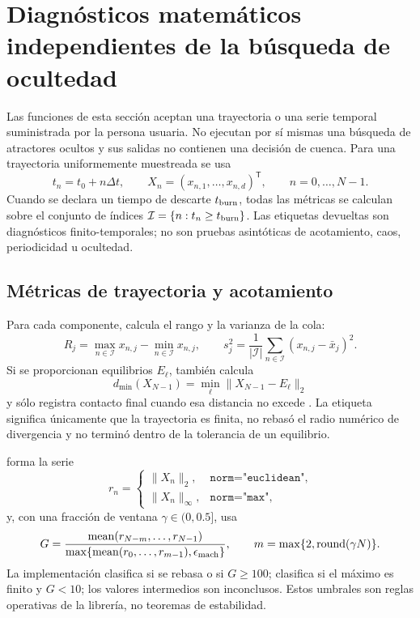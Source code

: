 \section{Diagnósticos matemáticos independientes de la búsqueda de ocultedad}
\label{sec:diagnosticos-independientes}

Las funciones de esta sección aceptan una trayectoria o una serie temporal
suministrada por la persona usuaria. No ejecutan por sí mismas una búsqueda de
atractores ocultos y sus salidas no contienen una decisión de cuenca. Para una
trayectoria uniformemente muestreada se usa
\[
 t_n=t_0+n\Delta t,\qquad
 X_n=(x_{n,1},\ldots,x_{n,d})^\mathsf{T},\qquad n=0,\ldots,N-1.
\]
Cuando se declara un tiempo de descarte \(t_{\rm burn}\), todas las métricas se
calculan sobre el conjunto de índices
\(\mathcal I=\{n:t_n\geq t_{\rm burn}\}\). Las etiquetas devueltas son
diagnósticos finito-temporales; no son pruebas asintóticas de acotamiento,
caos, periodicidad u ocultedad.

\subsection{Métricas de trayectoria y acotamiento}

Para cada componente,  calcula el rango y
la varianza de la cola:
\[
 R_j=\max_{n\in\mathcal I}x_{n,j}
     -\min_{n\in\mathcal I}x_{n,j},
 \qquad
 s_j^2=\frac{1}{|\mathcal I|}
 \sum_{n\in\mathcal I}(x_{n,j}-\bar x_j)^2.
\]
Si se proporcionan equilibrios \(E_\ell\), también calcula
\[
 d_{\min}(X_{N-1})=\min_\ell\|X_{N-1}-E_\ell\|_2
\]
y sólo registra contacto final cuando esa distancia no excede
. La etiqueta  significa
únicamente que la trayectoria es finita, no rebasó el radio numérico de
divergencia y no terminó dentro de la tolerancia de un equilibrio.

 forma la serie
\[
 r_n=
 \begin{cases}
 \|X_n\|_2,&\texttt{norm="euclidean"},\\
 \|X_n\|_\infty,&\texttt{norm="max"},
 \end{cases}
\]
y, con una fracción de ventana \(\gamma\in(0,0.5]\), usa
\[
 G=\frac{\operatorname{mean}(r_{N-m},\ldots,r_{N-1})}
 {\max\{\operatorname{mean}(r_0,\ldots,r_{m-1}),\epsilon_{\rm mach}\}},
 \qquad m=\max\{2,\operatorname{round}(\gamma N)\}.
\]
La implementación clasifica  si se rebasa
 o si \(G\geq100\); clasifica
 si el máximo es finito y \(G<10\); los valores
intermedios son inconclusos. Estos umbrales son reglas operativas de la
librería, no teoremas de estabilidad.

